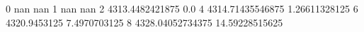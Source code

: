0 nan nan
1 nan nan
2 4313.4482421875 0.0
4 4314.71435546875 1.26611328125
6 4320.9453125 7.4970703125
8 4328.04052734375 14.59228515625
